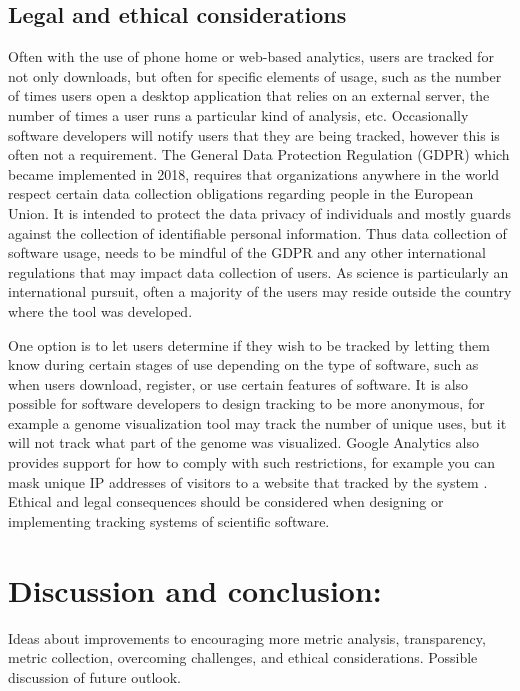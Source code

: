 \documentclass{article}
\begin{document}
\subsection{Legal and ethical considerations}\label{sec:legal_ethics}
Often with the use of phone home or web-based analytics, users are tracked for not only downloads, but often for specific elements of usage, such as the number of times users open a desktop application that relies on an external server, the number of times a user runs a particular kind of analysis, etc. Occasionally software developers will notify users that they are being tracked, however this is often not a requirement. The General Data Protection Regulation (GDPR) which became implemented in 2018, requires that organizations anywhere in the world respect certain data collection obligations regarding people in the European Union. It is intended to protect the data privacy of individuals and mostly guards against the collection of identifiable personal information. Thus data collection of software usage, needs to be mindful of the GDPR and any other international regulations that may impact data collection of users.  As science is particularly an international pursuit, often a majority of the users may reside outside the country where the tool was developed.

One option is to let users determine if they wish to be tracked by letting them know during certain stages of use depending on the type of software, such as when users download, register, or use certain features 
 of software. It is also possible for software developers to design tracking to be more anonymous, for example a genome visualization tool may track the number of unique uses, but it will not track what part of the genome was visualized. Google Analytics also provides support for how to comply with such restrictions, for example you can  mask unique IP addresses of visitors to a website that tracked by the system \cite{google_analytics_privacy}.  Ethical and legal consequences should be considered when designing or implementing tracking systems of scientific software. 



\section{Discussion and conclusion:}
 Ideas about improvements to encouraging more metric analysis, transparency, metric collection, overcoming challenges, and ethical considerations. Possible discussion of future outlook.
\end{document}
